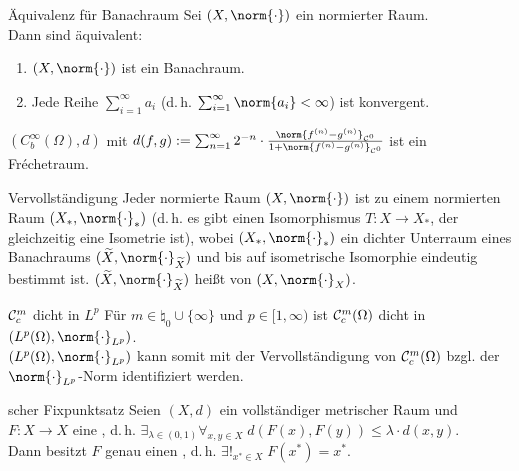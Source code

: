 \begin{Lemma}{Äquivalenz für Banachraum}
    Sei $(X, \norm{\cdot})$ ein normierter Raum.\\
    Dann sind äquivalent:
    \begin{enumerate}
        \item
        $(X, \norm{\cdot})$ ist ein Banachraum.
        
        \item
        Jede  Reihe $\sum_{i=1}^\infty a_i$
        (d.\,h. $\sum_{i=1}^\infty \norm{a_i} < \infty$) ist konvergent.
    \end{enumerate}
\end{Lemma}

\linie

\begin{Bsp}
    $(C^\infty_b(\Omega), d)$ mit $d(f, g) := \sum_{n=1}^\infty 2^{-n} \cdot
    \frac{\norm{f^{(n)} - g^{(n)}}_{\C^0}}{1 + \norm{f^{(n)} - g^{(n)}}_{\C^0}}$
    ist ein Fréchetraum.
\end{Bsp}

\begin{Satz}{Vervollständigung}
    Jeder normierte Raum $(X, \norm{\cdot})$ ist  zu einem
    normierten Raum $(X_\ast, \norm{\cdot}_\ast)$
    (d.\,h. es gibt einen Isomorphismus $T\colon X \rightarrow X_\ast$, der gleichzeitig
    eine Isometrie ist),
    wobei $(X_\ast, \norm{\cdot}_\ast)$ ein dichter Unterraum eines Banachraums
    $(\widetilde{X}, \norm{\cdot}_{\widetilde{X}})$ und
    bis auf isometrische Isomorphie eindeutig bestimmt ist.
    $(\widetilde{X}, \norm{\cdot}_{\widetilde{X}})$
    heißt  von $(X, \norm{\cdot}_X)$.
\end{Satz}

\begin{Satz}{$\mathcal{C}^m_c$ dicht in $L^p$}
    Für $m \in \natural_0 \cup \{\infty\}$ und $p \in [1, \infty)$ ist
    $\mathcal{C}^m_c(\Omega)$ dicht in $(L^p(\Omega), \norm{\cdot}_{L^p})$.\\
    $(L^p(\Omega), \norm{\cdot}_{L^p})$ kann somit mit der Vervollständigung von $\mathcal{C}^m_c(\Omega)$
    bzgl. der $\norm{\cdot}_{L^p}$-Norm identifiziert werden.
\end{Satz}

\linie

\begin{Satz}{scher Fixpunktsatz}
    Seien $(X, d)$ ein vollständiger metrischer Raum und\\
    $F\colon X \rightarrow X$ eine , d.\,h.
    $\exists_{\lambda \in (0, 1)} \forall_{x, y \in X}\;
    d(F(x), F(y)) \le \lambda \cdot d(x, y)$.\\
    Dann besitzt $F$ genau einen ,
    d.\,h. $\exists!_{x^\ast \in X}\; F(x^\ast) = x^\ast$.
\end{Satz}


